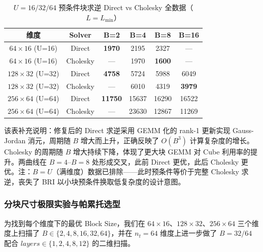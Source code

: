     \begin{table}[H]
        \centering
        \caption{$U=16/32/64$ 预条件块求逆 Direct vs Cholesky 全数据（$L=L_{\min}$）}
        \begin{tabular}{|c|c|c|c|c|c|}
            \hline
            \textbf{维度}          & \textbf{Solver} & \textbf{B=2}   & \textbf{B=4} & \textbf{B=8}  & \textbf{B=16} \\
            \hline
            $64\times16$ (U=16)  & Direct          & \textbf{1970}  & 2195         & 2327          & —             \\
            $64\times16$ (U=16)  & Cholesky        & —              & 1970         & \textbf{1600} & —             \\
            \hline
            $128\times32$ (U=32) & Direct          & \textbf{4758}  & 5724         & 5988          & 6049          \\
            $128\times32$ (U=32) & Cholesky        & —              & 6010         & 4319          & \textbf{3979} \\
            \hline
            $256\times64$ (U=64) & Direct          & \textbf{11750} & 15637        & 16290         & 16522         \\
            $256\times64$ (U=64) & Cholesky        & —              & 23630        & 12867         & 11269         \\
            \hline
        \end{tabular}
    \end{table}

    该表补充说明：修复后的 Direct 求逆采用 GEMM 化的 rank-1 更新实现 Gauss-Jordan
    消元，周期随 $B$ 增大而上升，正确反映了 $O(B^{3})$
    计算复杂度的增长。Cholesky 的周期随 $B$ 增大持续下降，体现了更大块 GEMM 对
    Cube 利用率的提升。两曲线在 $B=4$--$B=8$ 处形成交叉，此前 Direct 更优，此后 Cholesky
    更优。注：$B=U$（满维度）数据已排除——此时预条件等价于完整 Cholesky 求逆，丧失了
    BRI 以小块预条件换取低复杂度的设计意图。

    \subsubsection{分块尺寸极限实验与帕累托选型}

    为找到每个维度下的最优 Block Size，我们在 $64\times16$、$128\times32$、$256\times
    64$ 三个维度上扫描了 $B\in\{2,4,8,16,32,64\}$，并在 $n_{t}=64$
    维度上进一步做了 $B=32/64$ 配合 $\textit{layers}\in\{1,2,4,8,12\}$
    的二维扫描。

